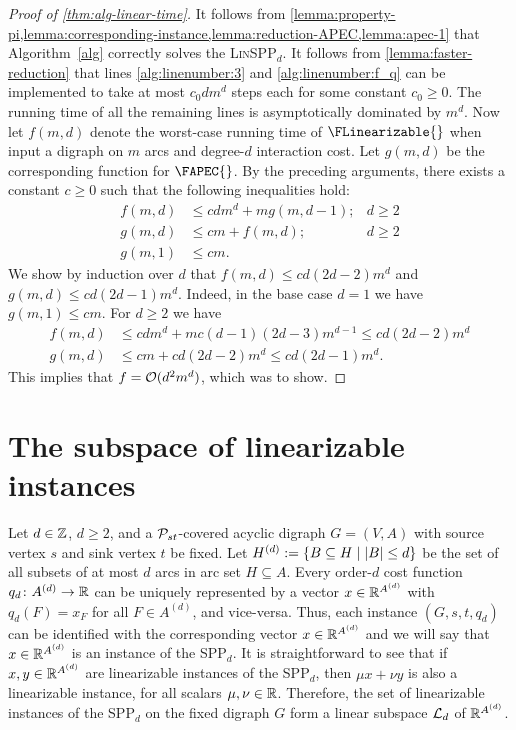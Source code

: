 \begin{proof}[Proof of \cref{thm:alg-linear-time}]
It follows from \cref{lemma:property-pi,lemma:corresponding-instance,lemma:reduction-APEC,lemma:apec-1} that Algorithm~\ref{alg} correctly solves the \textsc{Lin}SPP$_d$. It follows from \cref{lemma:faster-reduction} that lines \ref{alg:linenumber:3} and \ref{alg:linenumber:f_q} can be implemented to take at most $c_0dm^d$ steps each for some constant $c_0 \geq 0$. The running time of all the remaining lines is asymptotically dominated by $m^d$. Now let $f(m, d)$ denote the worst-case running time of $\FLinearizable{}$ when input a digraph on $m$ arcs and degree-$d$ interaction cost. Let $g(m, d)$ be the corresponding function for $\FAPEC{}$. By the preceding arguments, there exists a constant $c \geq 0$ such that the following inequalities hold:
\begin{align*}
    f(m ,d) &\leq cdm^d + mg(m, d-1); & d \geq 2\\
    g(m, d) &\leq cm + f(m, d); & d \geq 2\\
    g(m, 1) &\leq cm.
\end{align*}
We show by induction over $d$ that $f(m, d) \leq cd(2d - 2)m^d$ and $g(m, d) \leq cd(2d - 1)m^d$. Indeed, in the base case $d = 1$ we have $g(m, 1) \leq cm$. For $d \geq 2$ we have 
\begin{align*}
    f(m, d) &\leq cdm^d + mc(d-1)(2d - 3)m^{d-1} \leq cd(2d - 2)m^d \\
    g(m, d) &\leq cm + cd(2d - 2)m^d \leq cd(2d -1)m^d. 
\end{align*}
This implies that $f = \mathcal{O}(d^2m^d)$, which was to show.
\end{proof}

\section{The subspace of linearizable instances}
\label{sec:subspace}

Let $d\in \mathbb{Z}$, $d\ge 2$, and a $\mathcal{P}_{st}$-covered acyclic digraph  $G = (V, A)$ with source vertex $s$ and sink vertex $t$  be  fixed. 
Let $H^{(d)} := \{ B \subseteq H \mid |B| \leq d \}$ be the set of all subsets of at most $d$ arcs in arc set $H\subseteq A$.
Every order-$d$ cost function $q_d\colon A^{(d)}\to \mathbb{R}$ can be uniquely represented by a vector $x \in \mathbb{R}^{A^{(d)}}$ with $q_d(F)=x_F$ for all $F\in A^{(d)}$, and vice-versa. Thus, each instance $(G,s,t,q_d)$ can be identified with the corresponding vector $x\in \mathbb{R}^{A^{(d)}}$ and we will say that $x\in \mathbb{R}^{A^{(d)}}$ is an instance of the SPP$_d$. 
It is straightforward to see that if $x,y \in \mathbb{R}^{A^{(d)}}$ are linearizable instances of the SPP$_d$, then $\mu x + \nu y$ is also a linearizable instance, for all scalars $\mu,\nu \in \mathbb{R}$.
Therefore, the set of linearizable instances of the SPP$_d$ on the fixed digraph  $G$ form a linear subspace ${\cal L}_d$ of $\mathbb{R}^{A^{(d)}}$. 

